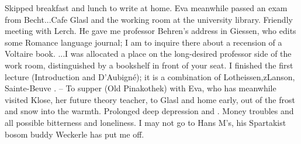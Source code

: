 
Skipped breakfast and lunch to write at home. Eva meanwhile passed an exam from Becht...Cafe Glasl and the working room at the university library. Friendly meeting with Lerch. He gave me professor Behren's address in Giessen, who edits some Romance language journal; I am to inquire there about a recension of a Voltaire book. ...I was allocated a place on the long-desired professor side of the work room, distinguished by a bookshelf in front of your seat. I finished the first lecture (Introduction and D'Aubigné); it is a combination of Lotheissen,zLanson, Sainte-Beuve . -- To supper (Old Pinakothek) with Eva, who has meanwhile visited Klose, her future theory teacher, to Glasl and home early, out of the frost and snow into the warmth. Prolonged deep depression and . Money troubles and all possible bitterness and loneliness. I may not go to Hans M's, his Spartakist bosom buddy Weckerle has put me off.

